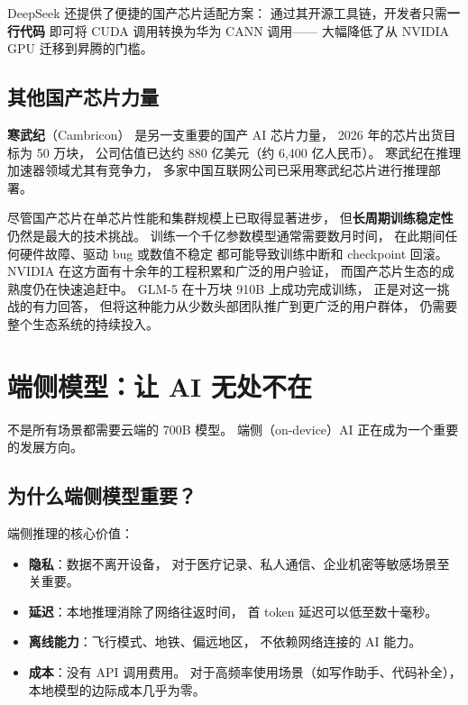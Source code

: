DeepSeek 还提供了便捷的国产芯片适配方案：
通过其开源工具链，开发者只需\textbf{一行代码}
即可将 CUDA 调用转换为华为 CANN 调用——
大幅降低了从 NVIDIA GPU 迁移到昇腾的门槛。

\subsection{其他国产芯片力量}

\textbf{寒武纪}（Cambricon）
是另一支重要的国产 AI 芯片力量，
2026 年的芯片出货目标为 50 万块，
公司估值已达约 880 亿美元（约 6,400 亿人民币）。
寒武纪在推理加速器领域尤其有竞争力，
多家中国互联网公司已采用寒武纪芯片进行推理部署。

\begin{warnbox}
尽管国产芯片在单芯片性能和集群规模上已取得显著进步，
但\textbf{长周期训练稳定性}仍然是最大的技术挑战。
训练一个千亿参数模型通常需要数月时间，
在此期间任何硬件故障、驱动 bug 或数值不稳定
都可能导致训练中断和 checkpoint 回滚。
NVIDIA 在这方面有十余年的工程积累和广泛的用户验证，
而国产芯片生态的成熟度仍在快速追赶中。
GLM-5 在十万块 910B 上成功完成训练，
正是对这一挑战的有力回答，
但将这种能力从少数头部团队推广到更广泛的用户群体，
仍需要整个生态系统的持续投入。
\end{warnbox}

\section{端侧模型：让 AI 无处不在}

不是所有场景都需要云端的 700B 模型。
端侧（on-device）AI 正在成为一个重要的发展方向。

\subsection{为什么端侧模型重要？}

端侧推理的核心价值：

\begin{itemize}[noitemsep]
  \item \textbf{隐私}：数据不离开设备，
        对于医疗记录、私人通信、企业机密等敏感场景至关重要。
  \item \textbf{延迟}：本地推理消除了网络往返时间，
        首 token 延迟可以低至数十毫秒。
  \item \textbf{离线能力}：飞行模式、地铁、偏远地区，
        不依赖网络连接的 AI 能力。
  \item \textbf{成本}：没有 API 调用费用。
        对于高频率使用场景（如写作助手、代码补全），
        本地模型的边际成本几乎为零。
\end{itemize}

